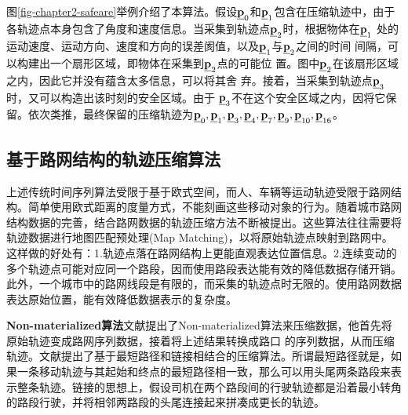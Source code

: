 图\ref{fig-chapter2-safeare}举例介绍了本算法。假设$\emph{{\textbf{p}}}_0$和$\emph{{\textbf{p}}}_1$包含在压缩轨迹中，由于各轨迹点本身包含了角度和速度信息。当采集到轨迹点$\emph{{\textbf{p}}}_2$时，根据物体在$\emph{{\textbf{p}}}_1$ 处的运动速度、运动方向、速度和方向的误差阂值，以及$\emph{{\textbf{p}}}_1$与$\emph{{\textbf{p}}}_2$之间的时间 间隔，可以构建出一个扇形区域，即物体在采集到$\emph{{\textbf{p}}}_2$点的可能位 置。图中$\emph{{\textbf{p}}}_2$在该扇形区域之内，因此它并没有蕴含太多信息，可以将其舍 弃。接着，当采集到轨迹点$\emph{{\textbf{p}}}_3$时，又可以构造出该时刻的安全区域。由于 $\emph{{\textbf{p}}}_3$不在这个安全区域之内，因将它保留。依次类推，最终保留的压缩轨迹为$\emph{{\textbf{p}}}_0,\emph{{\textbf{p}}}_1,\emph{{\textbf{p}}}_3,\emph{{\textbf{p}}}_4,\emph{{\textbf{p}}}_7,\emph{{\textbf{p}}}_9,\emph{{\textbf{p}}}_{10},\emph{{\textbf{p}}}_{16}$。

\subsection{基于路网结构的轨迹压缩算法}
上述传统时间序列算法受限于基于欧式空间，而人、车辆等运动轨迹受限于路网结构。简单使用欧式距离的度量方式，不能刻画这些移动对象的行为。随着城市路网结构数据的完善，结合路网数据的轨迹压缩方法不断被提出。这些算法往往需要将轨迹数据进行地图匹配预处理(Map Matching)，以将原始轨迹点映射到路网中。这样做的好处有：1.轨迹点落在路网结构上更能直观表达位置信息。2.连续变动的多个轨迹点可能对应同一个路段，因而使用路段表达能有效的降低数据存储开销。此外，一个城市中的路网线段是有限的，而采集的轨迹点时无限的。使用路网数据表达原始位置，能有效降低数据表示的复杂度。

\textbf{Non-materialized算法}文献\cite{YinW04}提出了Non-materialized算法来压缩数据，他首先将原始轨迹变成路网序列数据，接着将上述结果转换成路口 的序列数据，从而压缩轨迹。文献\cite{nonmaterialized}提出了基于最短路径和链接相结合的压缩算法。所谓最短路径就是，如果一条移动轨迹与其起始和终点的最短路径相一致，那么可以用头尾两条路段来表示整条轨迹。链接的思想上，假设司机在两个路段间的行驶轨迹都是沿着最小转角的路段行驶，并将相邻两路段的头尾连接起来拼凑成更长的轨迹。

